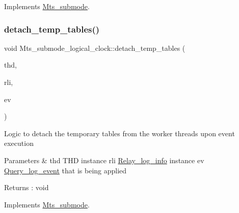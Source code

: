 Implements \mbox{\hyperlink{classMts__submode}{Mts\+\_\+submode}}.

\mbox{\label{classMts__submode__logical__clock_a0cff354bc8566687d40530c2cc430128}} 
\subsubsection{\texorpdfstring{detach\+\_\+temp\+\_\+tables()}{detach\_temp\_tables()}}
{\footnotesize\ttfamily void Mts\+\_\+submode\+\_\+logical\+\_\+clock\+::detach\+\_\+temp\+\_\+tables (\begin{DoxyParamCaption}\item[{T\+HD $\ast$}]{thd,  }\item[{const \mbox{\hyperlink{classRelay__log__info}{Relay\+\_\+log\+\_\+info}} $\ast$}]{rli,  }\item[{\mbox{\hyperlink{classQuery__log__event}{Query\+\_\+log\+\_\+event}} $\ast$}]{ev }\end{DoxyParamCaption})\hspace{0.3cm}{\ttfamily [virtual]}}

Logic to detach the temporary tables from the worker threads upon event execution 
\begin{DoxyParams}{Parameters}
{\em } & thd T\+HD instance rli \mbox{\hyperlink{classRelay__log__info}{Relay\+\_\+log\+\_\+info}} instance ev \mbox{\hyperlink{classQuery__log__event}{Query\+\_\+log\+\_\+event}} that is being applied \\
\hline
\end{DoxyParams}
\begin{DoxyReturn}{Returns}
\+: void 
\end{DoxyReturn}


Implements \mbox{\hyperlink{classMts__submode}{Mts\+\_\+submode}}.

\mbox{\label{classMts__submode__logical__clock_a093957d2566da47579792a82f499e147}} 
